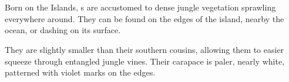 \section{\enemyKhornakName{}}
\label{enemyKhornak}

Born on the Islands, \enemyKhornak{}s are accustomed to dense jungle vegetation sprawling everywhere around. They can be found on the edges of the island, nearby the ocean, or dashing on its surface.

They are slightly smaller than their southern cousins, allowing them to easier squeeze through entangled jungle vines. Their carapace is paler, nearly white, patterned with violet marks on the edges.



\vspace{1cm}


